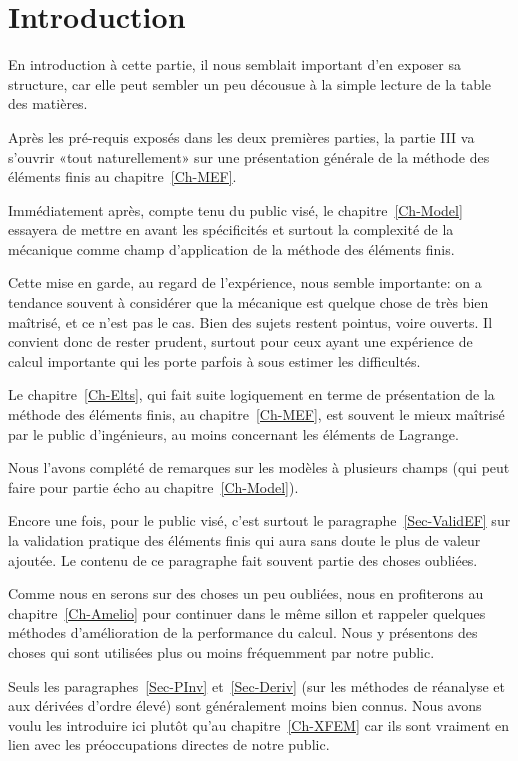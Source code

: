 \chapter*{Introduction}
En introduction à cette partie, il nous semblait important d'en exposer sa structure, car
elle peut sembler un peu décousue à la simple lecture de la table des matières.

\medskip
Après les pré-requis exposés dans les deux premières parties, la partie III va s'ouvrir
«tout naturellement» sur une présentation générale de la méthode des éléments finis au chapitre~\ref{Ch-MEF}.

\medskip
Immédiatement après, compte tenu du public visé, le chapitre~\ref{Ch-Model} essayera
de mettre en avant les spécificités et surtout la complexité de la mécanique comme champ
d'application de la méthode des éléments finis.

Cette mise en garde, au regard de l'expérience, nous semble importante:
on a tendance souvent à considérer que la mécanique est quelque chose de très bien
maîtrisé, et ce n'est pas le cas. Bien des sujets restent pointus, voire ouverts. Il convient
donc de rester prudent, surtout pour ceux ayant une expérience de calcul importante qui les
porte parfois à sous estimer les difficultés.

\medskip
Le chapitre~\ref{Ch-Elts}, qui fait suite logiquement en terme de présentation de la méthode des éléments finis, au
chapitre~\ref{Ch-MEF}, est souvent le mieux maîtrisé par le public d'ingénieurs, au moins
concernant les éléments de Lagrange.

Nous l'avons complété de remarques sur les modèles à plusieurs champs (qui peut faire pour
partie écho au chapitre~\ref{Ch-Model}).

Encore une fois, pour le public visé, c'est surtout le paragraphe~\ref{Sec-ValidEF} sur
la validation pratique des éléments finis qui aura sans doute le plus de valeur ajoutée. Le contenu
de ce paragraphe fait souvent partie des choses oubliées.

\medskip
Comme nous en serons sur des choses un peu oubliées, nous en profiterons au chapitre~\ref{Ch-Amelio}
pour continuer dans le même sillon et rappeler quelques méthodes d'amélioration de la
performance du calcul. Nous y présentons des choses qui sont utilisées plus ou moins
fréquemment par notre public.

Seuls les paragraphes~\ref{Sec-PInv} et~\ref{Sec-Deriv} (sur les méthodes de réanalyse et aux dérivées
d'ordre élevé) sont généralement moins bien connus. Nous avons voulu les introduire ici plutôt qu'au
chapitre~\ref{Ch-XFEM} car ils sont vraiment en lien avec les préoccupations directes de notre
public.

